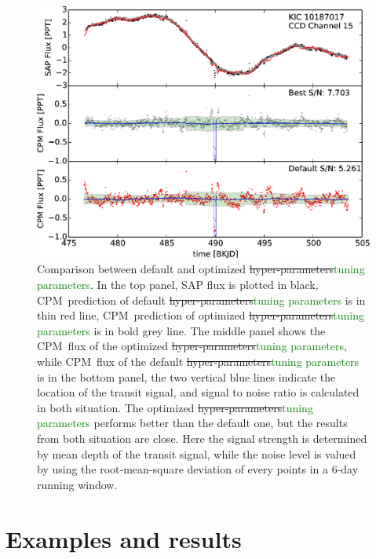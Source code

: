 \documentclass[12pt, preprint]{aastex}
\newcommand{\name}{CPM}
\newcommand{\revise}[1]{\textcolor{green}{#1}}
\newcommand{\remove}[1]{\sout{#1}}
\begin{document}
\begin{figure}[p]
\begin{center}
\includegraphics[width=\textwidth]{f3}
\end{center}
\caption{
  \label{hyperparameter} 
  Comparison between default and optimized \remove{hyper-parameters}\revise{tuning parameters}. 
  In the top panel, SAP flux is plotted in black, 
    \name\ prediction of default \remove{hyper-parameters}\revise{tuning parameters} is in thin red line, 
    \name\ prediction of optimized \remove{hyper-parameters}\revise{tuning parameters} is in bold grey line. 
  The middle panel shows the \name\ flux of the optimized \remove{hyper-parameters}\revise{tuning parameters}, 
    while \name\ flux of the default \remove{hyper-parameters}\revise{tuning parameters} is in the bottom panel, 
    the two vertical blue lines indicate the location of the transit signal, 
    and signal to noise ratio is calculated in both situation. 
  The optimized \remove{hyper-parameters}\revise{tuning parameters} performs better than the default one, 
    but the results from both situation are close.
  Here the signal strength is determined by mean depth of the transit signal,
    while the noise level is valued by 
    using the root-mean-square deviation of every points in a 6-day running window.}
\end{figure}

\section{Examples and results}
\end{document}
